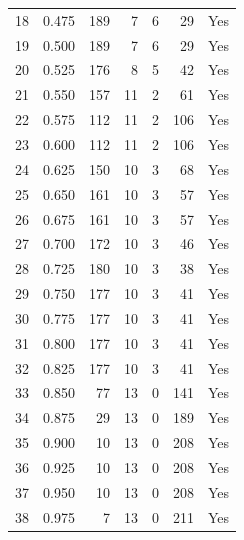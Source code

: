 \documentclass[a4paper,twoside,12pt]{book}
\begin{document}
\begin{appendices}
\begin{table}
\begin{tabular}{lrrrrrl}
		18 &  0.475 &       189 &         7 &               6 &              29 &    Yes \\
		19 &  0.500 &       189 &         7 &               6 &              29 &    Yes \\
		20 &  0.525 &       176 &         8 &               5 &              42 &    Yes \\
		21 &  0.550 &       157 &        11 &               2 &              61 &    Yes \\
		22 &  0.575 &       112 &        11 &               2 &             106 &    Yes \\
		23 &  0.600 &       112 &        11 &               2 &             106 &    Yes \\
		24 &  0.625 &       150 &        10 &               3 &              68 &    Yes \\
		25 &  0.650 &       161 &        10 &               3 &              57 &    Yes \\
		26 &  0.675 &       161 &        10 &               3 &              57 &    Yes \\
		27 &  0.700 &       172 &        10 &               3 &              46 &    Yes \\
		28 &  0.725 &       180 &        10 &               3 &              38 &    Yes \\
		29 &  0.750 &       177 &        10 &               3 &              41 &    Yes \\
		30 &  0.775 &       177 &        10 &               3 &              41 &    Yes \\
		31 &  0.800 &       177 &        10 &               3 &              41 &    Yes \\
		32 &  0.825 &       177 &        10 &               3 &              41 &    Yes \\
		33 &  0.850 &        77 &        13 &               0 &             141 &    Yes \\
		34 &  0.875 &        29 &        13 &               0 &             189 &    Yes \\
		35 &  0.900 &        10 &        13 &               0 &             208 &    Yes \\
		36 &  0.925 &        10 &        13 &               0 &             208 &    Yes \\
		37 &  0.950 &        10 &        13 &               0 &             208 &    Yes \\
		38 &  0.975 &         7 &        13 &               0 &             211 &    Yes \\

\end{tabular}
\end{table}
\end{appendices}
\end{document}
